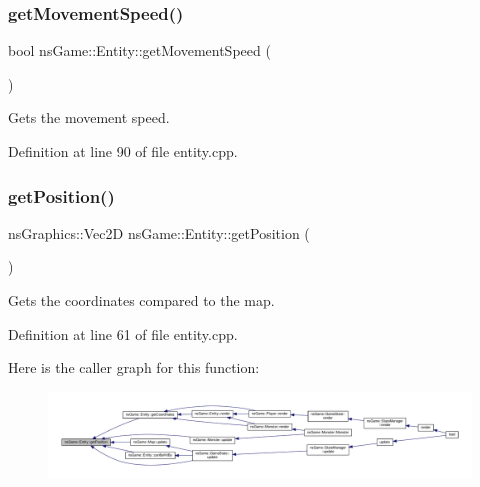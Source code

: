 \subsubsection{\texorpdfstring{get\+Movement\+Speed()}{getMovementSpeed()}}
{\footnotesize\ttfamily bool ns\+Game\+::\+Entity\+::get\+Movement\+Speed (\begin{DoxyParamCaption}{ }\end{DoxyParamCaption})}



Gets the movement speed. 



Definition at line 90 of file entity.\+cpp.

\mbox{\label{structns_game_1_1_entity_ab7fc1631346d2c643161d229dd653edd}} 
\subsubsection{\texorpdfstring{get\+Position()}{getPosition()}}
{\footnotesize\ttfamily ns\+Graphics\+::\+Vec2D ns\+Game\+::\+Entity\+::get\+Position (\begin{DoxyParamCaption}{ }\end{DoxyParamCaption})}



Gets the coordinates compared to the map. 



Definition at line 61 of file entity.\+cpp.

Here is the caller graph for this function\+:\nopagebreak
\begin{figure}[H]
\begin{center}
\leavevmode
\includegraphics[width=350pt]{structns_game_1_1_entity_ab7fc1631346d2c643161d229dd653edd_icgraph}
\end{center}
\end{figure}
\mbox{\label{structns_game_1_1_entity_af5bf634702f96ed5daac8130a3dee4f0}} 
